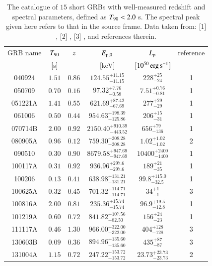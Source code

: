 \begin{table}
\caption[Catalogue of short GRBs with both redshift and spectral parameters]{The catalogue of $15$ short GRBs with well-measured redshift and spectral parameters, defined as $T_{\rm{90}} < 2.0$ s. The spectral peak given here refers to that in the source frame. Data taken from: [1] , [2] , [3] , and references therein.}
\label{tab:short_catalogue}
\begin{center}
\begin{tabular}{|c|c|c|c|c|c|}
\hline
GRB name & $T_{\rm{90}}$ & $z$ & $E_{{\rm p,0}}$ & $L_{\rm p}$ & reference \\
 & [s] &  & [keV] & [$10^{50} \, \rm erg \, s^{-1}$] & \\
\hline
\hline
040924 & $1.51$ & $0.86$ & ${124.55}^{+11.15}_{-11.15}$ & $228^{+25}_{-24}$ & 1 \\
\hline
050709 & $0.70$ & $0.16$ & ${97.32}^{+7.76}_{-0.58}$ & $7.51^{+0.76}_{-0.81}$ & 1 \\
\hline
051221A & $1.41$ & $0.55$ & ${621.69}^{+87.42}_{-67.69}$ & $277^{+29}_{-29}$ & 1 \\
\hline
061006 & $0.50$ & $0.44$ & ${954.63}^{+198.39}_{-125.86}$ & $206^{+15}_{-31}$ & 1 \\
\hline
070714B & $2.00$ & $0.92$ & ${2150.40}^{+910.39}_{-443.52}$ & $656^{+79}_{-136}$ & 1 \\
\hline
080905A & $0.96$ & $0.12$ & ${759.30}^{+308.28}_{-308.28}$ & $1.02^{+1.02}_{-1.02}$ & 2 \\
\hline
090510 & $0.30$ & $0.90$ & ${8679.58}^{+947.69}_{-947.69}$ & $10400^{+2400}_{-1400}$ & 1 \\
\hline
100117A & $0.31$ & $0.92$ & ${936.96}^{+297.6}_{-297.6}$ & $189^{+21}_{-35}$ & 1 \\
\hline
100206 & $0.13$ & $0.41$ & ${638.98}^{+131.21}_{-131.21}$ & $99.8^{+115.0}_{-32.5}$ & 1 \\
\hline
100625A & $0.32$ & $0.45$ & ${701.32}^{+114.71}_{-114.71}$ & $34^{+1}_{-1}$ & 3 \\
\hline
100816A & $2.00$ & $0.81$ & ${235.36}^{+15.74}_{-15.74}$ & $96.9^{+19.5}_{-12.8}$ & 1 \\
\hline
101219A & $0.60$ & $0.72$ & ${841.82}^{+107.56}_{-82.50}$ & $156^{+24}_{-23}$ & 1 \\
\hline
111117A & $0.46$ & $1.30$ & ${966.00}^{+322.00}_{-322.00}$ & $404^{+128}_{-128}$ & 3 \\
\hline
130603B & $0.09$ & $0.36$ & ${894.96}^{+135.60}_{-135.60}$ & $435^{+87}_{-87}$ & 3 \\
\hline
131004A & $1.15$ & $0.72$ & ${247.22}^{+153.72}_{-153.72}$ & $23.73^{+23.73}_{-23.73}$ & 2 \\
\hline
\end{tabular}
\end{center}
\end{table}

